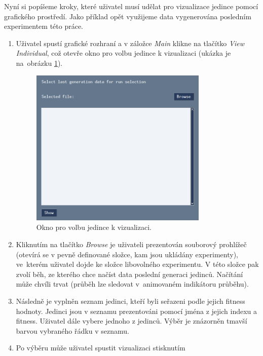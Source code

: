 Nyní si popíšeme kroky, které uživatel musí udělat pro vizualizace jedince
pomocí grafického prostředí. Jako příklad opět využijeme data vygenerována
posledním experimentem této práce.
\begin{enumerate}
    \item Uživatel spustí grafické rozhraní a v záložce \emph{Main} klikne na
        tlačítko \emph{View Individual}, což otevře okno pro volbu jedince k
        vizualizaci (ukázka je na~obrázku
        \ref{doc_23_visualization_indiv_popup}).
    \begin{figure}[!htb]
        \centering
        \includegraphics[width=0.8\textwidth]{../img/indiv_visualization_popup.jpg}
        \caption{Okno pro volbu jedince k vizualizaci.}
        \label{doc_23_visualization_indiv_popup}
    \end{figure}
    \item Kliknutím na tlačítko \emph{Browse} je uživateli prezentován
        souborový prohlížeč (otevírá se v pevně definované složce, kam jsou
        ukládány experimenty), ve~kterém uživatel dojde ke složce libovolného
        experimentu. V této složce pak zvolí běh, ze kterého chce načíst data
        poslední generaci jedinců. Načítání může chvíli trvat (průběh lze
        sledovat v~animovaném indikátoru průběhu).
    \item Následně je vyplněn seznam jedinci, kteří byli seřazeni podle jejich
        fitness hodnoty. Jedinci jsou v seznamu prezentováni pomocí jména z
        jejich indexu a fitness. Uživatel dále vybere jednoho z jedinců. Výběr
        je znázorněn tmavší barvou vybraného řádku v seznamu.
    \item Po výběru může uživatel spustit vizualizaci stisknutím

\end{enumerate}
